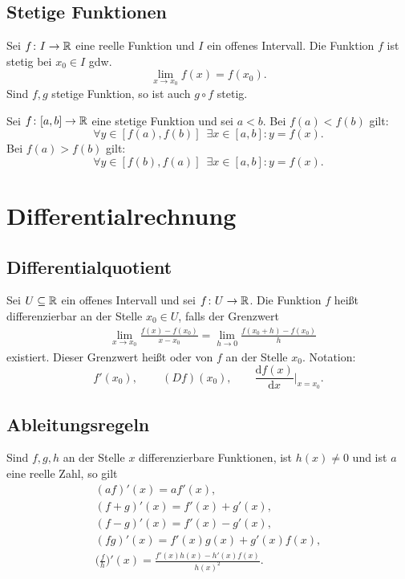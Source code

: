 \subsection{Stetige Funktionen}
Sei $f\colon I\to\mathbb R$ eine reelle Funktion und $I$ ein offenes
Intervall. Die Funktion $f$ ist stetig bei $x_0\in I$ gdw.
\begin{equation}
\lim_{x\to x_0} f(x)=f(x_0).
\end{equation}
Sind $f,g$ stetige Funktion, so ist auch $g\circ f$ stetig.

\noindent
{}
Sei $f\colon [a,b]\to\mathbb R$ eine stetige Funktion und sei
$a<b$. Bei $f(a)<f(b)$ gilt:
\begin{equation}
\forall y\in [f(a),f(b)]\enspace\exists x\in [a,b]\colon y=f(x).
\end{equation}
Bei $f(a)>f(b)$ gilt:
\begin{equation}
\forall y\in [f(b),f(a)]\enspace\exists x\in [a,b]\colon y=f(x).
\end{equation}

\section{Differentialrechnung}
\subsection{Differentialquotient}
\begin{Definition}
Sei $U\subseteq\mathbb R$ ein offenes Intervall
und sei $f\colon U\to\mathbb R$. Die Funktion $f$ heißt
differenzierbar
an der Stelle $x_0\in U$, falls der Grenzwert
\begin{equation}
\begin{split}
&\lim_{x\to x_0} \frac{f(x)-f(x_0)}{x-x_0}
= \lim_{h\to 0}\frac{f(x_0+h)-f(x_0)}{h}
\end{split}
\end{equation}
existiert. Dieser Grenzwert heißt
 oder 
von $f$ an der Stelle $x_0$. Notation:
\begin{equation}
f'(x_0),\,\qquad (Df)(x_0),\qquad \frac{\mathrm df(x)}{\mathrm dx}\Big|_{x=x_0}.
\end{equation}
\end{Definition}

\subsection{Ableitungsregeln}
Sind $f,g,h$ an der Stelle $x$ differenzierbare Funktionen,
ist $h(x)\ne 0$ und ist $a$ eine reelle Zahl, so gilt
\begin{gather}
(af)'(x) = af'(x),\\
(f+g)'(x) = f'(x)+g'(x),\\
(f-g)'(x) = f'(x)-g'(x),\\
(fg)'(x) = f'(x)g(x)+g'(x)f(x),\\
\Big(\frac{f}{h}\Big)'(x) = \frac{f'(x)h(x)-h'(x)f(x)}{h(x)^2}.
\end{gather}
